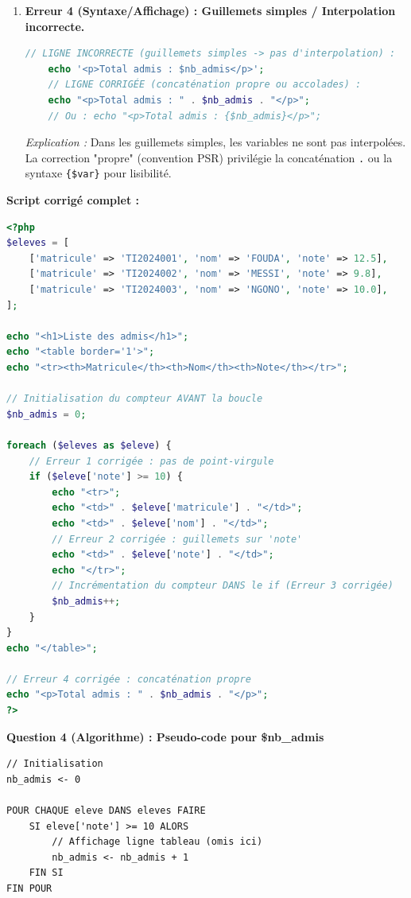 \documentclass[11pt]{article}
\begin{document}
\begin{corrige}
\begin{enumerate}
    \item \textbf{Erreur 4 (Syntaxe/Affichage) : Guillemets simples / Interpolation incorrecte.}
    \begin{lstlisting}[language=Php]
    // LIGNE INCORRECTE (guillemets simples -> pas d'interpolation) :
    echo '<p>Total admis : $nb_admis</p>'; 
    // LIGNE CORRIGÉE (concaténation propre ou accolades) :
    echo "<p>Total admis : " . $nb_admis . "</p>";
    // Ou : echo "<p>Total admis : {$nb_admis}</p>";
    \end{lstlisting}
    \emph{Explication :} Dans les guillemets simples, les variables ne sont pas interpolées. La correction "propre" (convention PSR) privilégie la concaténation \texttt{.} ou la syntaxe \texttt{\{\$var\}} pour lisibilité.
\end{enumerate}

\textbf{Script corrigé complet :}

\begin{lstlisting}[language=Php]
<?php
$eleves = [
    ['matricule' => 'TI2024001', 'nom' => 'FOUDA', 'note' => 12.5],
    ['matricule' => 'TI2024002', 'nom' => 'MESSI', 'note' => 9.8],
    ['matricule' => 'TI2024003', 'nom' => 'NGONO', 'note' => 10.0],
];

echo "<h1>Liste des admis</h1>";
echo "<table border='1'>";
echo "<tr><th>Matricule</th><th>Nom</th><th>Note</th></tr>";

// Initialisation du compteur AVANT la boucle
$nb_admis = 0; 

foreach ($eleves as $eleve) {
    // Erreur 1 corrigée : pas de point-virgule
    if ($eleve['note'] >= 10) { 
        echo "<tr>";
        echo "<td>" . $eleve['matricule'] . "</td>";
        echo "<td>" . $eleve['nom'] . "</td>";
        // Erreur 2 corrigée : guillemets sur 'note'
        echo "<td>" . $eleve['note'] . "</td>"; 
        echo "</tr>";
        // Incrémentation du compteur DANS le if (Erreur 3 corrigée)
        $nb_admis++; 
    }
}
echo "</table>";

// Erreur 4 corrigée : concaténation propre
echo "<p>Total admis : " . $nb_admis . "</p>"; 
?>
\end{lstlisting}

\textbf{Question 4 (Algorithme) : Pseudo-code pour \$nb\_admis}

\begin{lstlisting}[language={}]
// Initialisation
nb_admis <- 0

POUR CHAQUE eleve DANS eleves FAIRE
    SI eleve['note'] >= 10 ALORS
        // Affichage ligne tableau (omis ici)
        nb_admis <- nb_admis + 1
    FIN SI
FIN POUR


\end{lstlisting}
\end{corrige}
\end{document}
